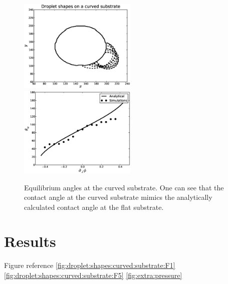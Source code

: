 \documentclass{article}
\begin{document}
\begin{figure}[h!]
\includegraphics[width=0.5\textwidth]{Figures/droplet_shapes_curved_substrates.eps}
\includegraphics[width=0.5\textwidth]{Figures/main_curve_circle.eps}\\
\caption{Equilibrium angles at the curved substrate. One can see that the contact angle at the curved substrate mimics the analytically calculated contact angle at the flat substrate. \label{fig:equilibrium:droplet:curved}}
\end{figure}


\pagebreak
\section{Results}

Figure reference \ref{fig:droplet:shapes:curved:substrate:F1} \ref{fig:droplet:shapes:curved:substrate:F5} \ref{fig:extra:pressure}
\end{document}
